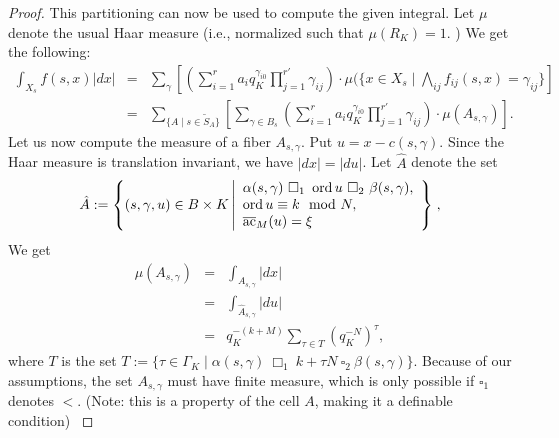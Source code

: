 \begin{proof}
This partitioning can now be used to compute the given integral. Let $\mu$ denote the usual Haar measure (i.e., normalized such that $\mu(R_K) =1$. ) We get the following:
\begin{eqnarray*}
 \int_{X_s} {f(s,x)}|dx| &=& \sum_\gamma \left[\left(\sum_{i=1}^r a_i q_K^{\gamma_{i0}} \prod_{j=1}^{r'}\gamma_{ij}\right)\cdot \mu(\{x\in X_s \mid \bigwedge_{ij} f_{ij}(s,x) = \gamma_{ij}\}\right]\\ 
 &=& \sum_{\{A \mid s \in \tilde{S}_A\}} \left[ \sum_{\gamma \in B_s} \left(\sum_{i=1}^r a_i q_K^{\gamma_{i0}} \prod_{j=1}^{r'}\gamma_{ij}\right) \cdot \mu(A_{s,\gamma})\right].
\end{eqnarray*}
Let us now compute the measure of a fiber $A_{s,\gamma}$. %
Put $u =x - c(s, \gamma)$. Since the Haar measure is translation invariant, we have $|dx|=|du|$. Let $\hat{A}$ denote the set
\[\hat{A}:=\left\{(s, \gamma, u) \in B \times K \left| \begin{array}{l} 
\alpha(s,\gamma) \ \square_{1}\ \operatorname{ord} u \ \square_{2}\ \beta(s, \gamma),\\
\operatorname{ord} u \equiv k \mod N,\\ {\overline{\rm ac}}_M(u) = \xi
\end{array}
\right\}\right.,\]
We get
\begin{eqnarray*}
\mu(A_{s,\gamma}) &=& \int_{A_{s,\gamma}}|dx|\\
&=& \int_{\hat{A}_{s,\gamma}}|du|
\\
&=&q_K^{-(k+M)}\sum_{\tau \in T} (q_K^{-N})^\tau,
\end{eqnarray*}
where $T$ is the set $T:=\{\tau \in \Gamma_K \mid \alpha(s,\gamma ) \ \Box_{1}\ k + \tau N\ \square_{2}\ \beta(s,\gamma)\}$.
Because of our assumptions, the set $A_{s,\gamma}$ must have finite measure, which is only possible if $\square_{1}$ denotes $<$.
{\color{red}
(Note: this is a property of the cell $A$, making it a definable condition)
} 


\end{proof}

